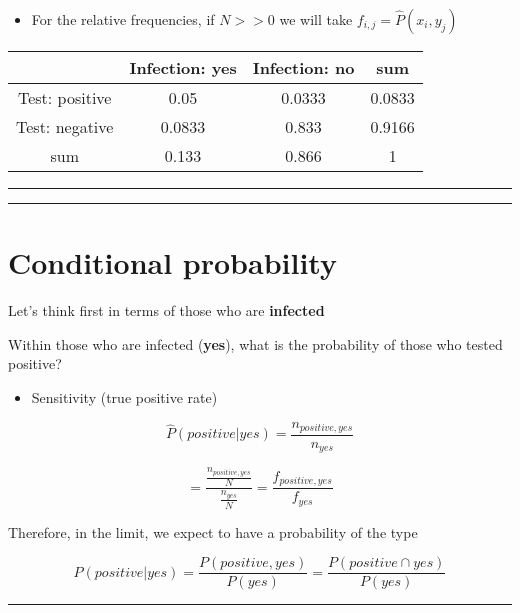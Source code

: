 \documentclass[
]{book}
\providecommand{\tightlist}{%
  \setlength{\itemsep}{0pt}\setlength{\parskip}{0pt}}
\begin{document}
\begin{itemize}
\tightlist
\item
  For the relative frequencies, if \(N>>0\) we will take \(f_{i,j}=\hat{P}(x_i, y_j)\)
\end{itemize}

\begin{longtable}[]{@{}cccc@{}}
\toprule
& Infection: yes & Infection: no & sum \\
\midrule
\endhead
Test: positive & 0.05 & 0.0333 & 0.0833 \\
Test: negative & 0.0833 & 0.833 & 0.9166 \\
sum & 0.133 & 0.866 & 1 \\
\bottomrule
\end{longtable}

\begin{center}\rule{0.5\linewidth}{0.5pt}\end{center}

\begin{center}\rule{0.5\linewidth}{0.5pt}\end{center}

\hypertarget{conditional-probability-1}{%
\section{Conditional probability}\label{conditional-probability-1}}

Let's think first in terms of those who are \textbf{infected}

Within those who are infected (\textbf{yes}), what is the probability of those who tested positive?

\begin{itemize}
\tightlist
\item
  Sensitivity (true positive rate)
\end{itemize}

\[\hat{P}(positive|yes)=\frac{n_{positive,yes}}{n_{yes}}\]

\[=\frac{\frac{n_{positive,yes}}{N}}{\frac{n_{yes}}{N}}=\frac{f_{positive,yes}}{f_{yes}}\]

Therefore, in the limit, we expect to have a probability of the type

\[P(positive|yes)=\frac{P(positive, yes)}{P(yes)}=\frac{P(positive \cap yes)}{P(yes)}\]

\begin{center}\rule{0.5\linewidth}{0.5pt}\end{center}
\end{document}
